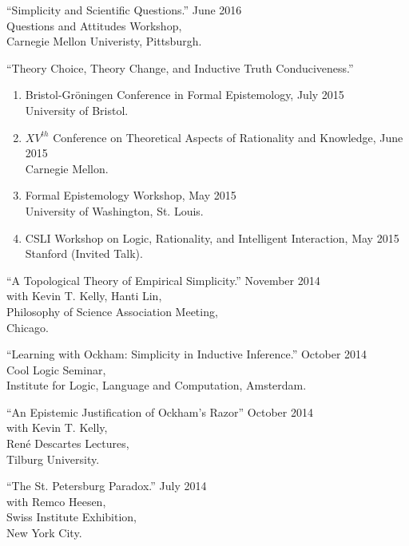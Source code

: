 \documentclass[12pt]{res} %
\begin{document}
\begin{resume}
``Simplicity and Scientific Questions.'' \hfill June 2016\\ 
Questions and Attitudes Workshop,\\
Carnegie Mellon Univeristy, Pittsburgh.

``Theory Choice, Theory Change, and Inductive Truth Conduciveness.''\\
\begin{enumerate}
\item Bristol-Gr\"{o}ningen Conference in Formal Epistemology, \hfill July 2015 \\University of Bristol. 
\item $XV^{th}$ Conference on Theoretical Aspects of Rationality and Knowledge, \hfill June 2015\\ Carnegie Mellon. 
\item Formal Epistemology Workshop, \hfill May 2015\\ University of Washington, St. Louis. 
\item CSLI Workshop on Logic, Rationality, and Intelligent Interaction, \hfill May 2015\\ Stanford (Invited Talk). 
\end{enumerate}

``A Topological Theory of Empirical Simplicity.'' \hfill November 2014\\
with Kevin T. Kelly, Hanti Lin,\\
Philosophy of Science Association Meeting,\\
Chicago.

``Learning with Ockham: Simplicity in Inductive Inference.'' \hfill October 2014\\
Cool Logic Seminar,\\ 
Institute for Logic, Language and Computation, Amsterdam.

``An Epistemic Justification of Ockham's Razor'' \hfill October 2014\\ with Kevin T. Kelly,\\ Ren\'{e} Descartes Lectures,\\
Tilburg University.

``The St. Petersburg Paradox.'' \hfill July 2014\\
with Remco Heesen,\\
Swiss Institute Exhibition,\\ 
New York City. 



\end{resume}
\end{document}
